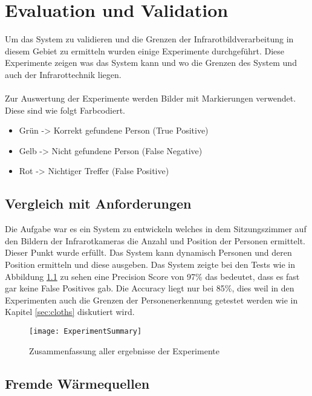 \chapter{Evaluation und Validation}
\label{ch:Eval}

Um das System zu validieren und die Grenzen der Infrarotbildverarbeitung in diesem Gebiet zu ermitteln wurden einige Experimente durchgeführt. Diese Experimente zeigen was das System kann und wo die Grenzen des System und auch der Infrarottechnik liegen.\\
\\
Zur Auswertung der Experimente werden Bilder mit Markierungen verwendet. Diese sind wie folgt Farbcodiert.
\begin{itemize}
	\item Grün -> Korrekt gefundene Person (True Positive)
	\item Gelb -> Nicht gefundene Person (False Negative)
	\item Rot -> Nichtiger Treffer (False Positive)
\end{itemize}

\section{Vergleich mit Anforderungen}
\label{sec:VergleichAnforderungen}

Die Aufgabe war es ein System zu entwickeln welches in dem Sitzungszimmer auf den Bildern der Infrarotkameras die Anzahl und Position der Personen ermittelt. Dieser Punkt wurde erfüllt. Das System kann dynamisch Personen und deren Position ermitteln und diese ausgeben. Das System zeigte bei den Tests wie in Abbildung \ref{fig:ExperimentSummary} zu sehen eine Precision Score von 97\% das bedeutet, dass es fast gar keine False Positives gab. Die Accuracy liegt nur bei 85\%, dies weil in den Experimenten auch die Grenzen der Personenerkennung getestet werden wie in Kapitel \ref{sec:cloths} diskutiert wird.

\begin{figure}[H]
	\centering
	\texttt{[image: ExperimentSummary]}
	\caption{Zusammenfassung aller ergebnisse der Experimente}
	\label{fig:ExperimentSummary}
\end{figure}



\section{Fremde Wärmequellen}
\label{sec:FremdeWärmequellen}

